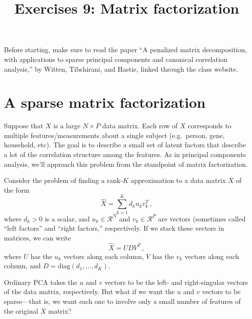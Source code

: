 \documentclass{mynotes}
\title[Exercises 9 $\cdot$ SDS 385]{Exercises 9: Matrix factorization}
\date{}  %
\begin{document}
\maketitle%

\bigskip

Before starting, make sure to read the paper ``A penalized matrix decomposition, with applications to sparse principal components and canonical correlation analysis,'' by Witten, Tibshirani, and Hastie, linked through the class website.

\section{A sparse matrix factorization}

Suppose that $X$ is a large $N \times P$ data matrix.  Each row of $X$ corresponds to multiple features/measurements about a single subject (e.g.~person, gene, household, etc).  The goal is to describe a small set of latent factors that describe a lot of the correlation structure among the features.  As in principal components analysis, we'll approach this problem from the standpoint of matrix factorization.

Consider the problem of finding a rank-$K$ approximation to a data matrix $X$ of the form
$$
\hat{X} = \sum_{k=1}^K d_k u_k v_k^T \, ,
$$
where $d_k > 0$ is a scalar, and $u_k \in \mathcal{R}^N$ and $v_k \in \mathcal{R}^P$ are vectors (sometimes called ``left factors'' and ``right factors,'' respectively.  If we stack these vectors in matrices, we can write
$$
\hat{X} = U D V^T \, ,
$$
where $U$ has the $u_k$ vectors along each column, $V$ has the $v_k$ vectors along each column, and $D = \mbox{diag}(d_1, \ldots, d_K)$. 

Ordinary PCA takes the $u$ and $v$ vectors to be the left- and right-singular vectors of the data matrix, respectively.  But what if we want the $u$ and $v$ vectors to be sparse---that is, we want each one to involve only a small number of features of the original $X$ matrix?
\end{document}

